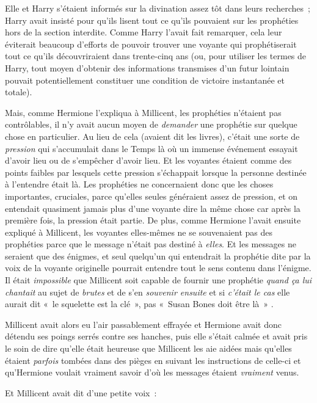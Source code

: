 Elle et Harry s'étaient informés sur la divination assez tôt dans leurs recherches~; Harry avait insisté pour qu'ils lisent tout ce qu'ils pouvaient sur les prophéties hors de la section interdite.
Comme Harry l'avait fait remarquer, cela leur éviterait beaucoup d'efforts de pouvoir trouver une voyante qui prophétiserait tout ce qu'ils découvriraient dans trente-cinq ans (ou, pour utiliser les termes de Harry, tout moyen d'obtenir des informations transmises d'un futur lointain pouvait potentiellement constituer une condition de victoire instantanée et totale).

Mais, comme Hermione l'expliqua à Millicent, les prophéties n'étaient pas contrôlables, il n'y avait aucun moyen de \emph{demander} une prophétie sur quelque chose en particulier.
Au lieu de cela (avaient dit les livres), c'était une sorte de \emph{pression} qui s'accumulait dans le Temps là où un immense événement essayait d'avoir lieu ou de s'empêcher d'avoir lieu.
Et les voyantes étaient comme des points faibles par lesquels cette pression s'échappait lorsque la personne destinée à l'entendre était là.
Les prophéties ne concernaient donc que les choses importantes, cruciales, parce qu'elles seules généraient assez de pression, et on entendait quasiment jamais plus d'une voyante dire la même chose car après la première fois, la pression était partie.
De plus, comme Hermione l'avait ensuite expliqué à Millicent, les voyantes elles-mêmes ne se souvenaient pas des prophéties parce que le message n'était pas destiné à \emph{elles}.
Et les messages ne seraient que des énigmes, et seul quelqu'un qui entendrait la prophétie dite par la voix de la voyante originelle pourrait entendre tout le sens contenu dans l'énigme.
Il était \emph{impossible} que Millicent soit capable de fournir une prophétie \emph{quand ça lui chantait} au sujet de \emph{brutes} et de s'en \emph{souvenir ensuite} et si \emph{c'était le cas} elle aurait dit «~le squelette est la clé~», pas «~Susan Bones\footnotemark{} doit être là~»
.

Millicent avait alors eu l'air passablement effrayée et Hermione avait donc détendu ses poings serrés contre ses hanches, puis elle s'était calmée et avait pris le soin de dire qu'elle était heureuse que Millicent les aie aidées mais qu'elles étaient \emph{parfois} tombées dans des pièges en suivant les instructions de celle-ci et qu'Hermione voulait vraiment savoir d'où les messages étaient \emph{vraiment} venus.

Et Millicent avait dit d'une petite voix~:

